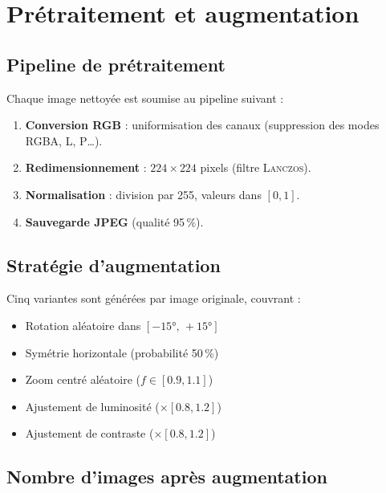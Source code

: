 \documentclass[12pt,a4paper]{article}
\begin{document}
\section{Prétraitement et augmentation}

\subsection{Pipeline de prétraitement}

Chaque image nettoyée est soumise au pipeline suivant :

\begin{enumerate}[label=\textbf{\arabic*.}]
  \item \textbf{Conversion RGB} : uniformisation des canaux (suppression des modes RGBA, L, P…).
  \item \textbf{Redimensionnement} : $224 \times 224$ pixels (filtre \textsc{Lanczos}).
  \item \textbf{Normalisation} : division par 255, valeurs dans $[0, 1]$.
  \item \textbf{Sauvegarde JPEG} (qualité 95\,\%).
\end{enumerate}

\subsection{Stratégie d'augmentation}

Cinq variantes sont générées par image originale, couvrant :

\begin{itemize}
  \item Rotation aléatoire dans $[-15°,\,+15°]$
  \item Symétrie horizontale (probabilité 50\,\%)
  \item Zoom centré aléatoire ($f \in [0.9, 1.1]$)
  \item Ajustement de luminosité ($\times [0.8, 1.2]$)
  \item Ajustement de contraste ($\times [0.8, 1.2]$)
\end{itemize}

\subsection{Nombre d'images après augmentation}
\end{document}
